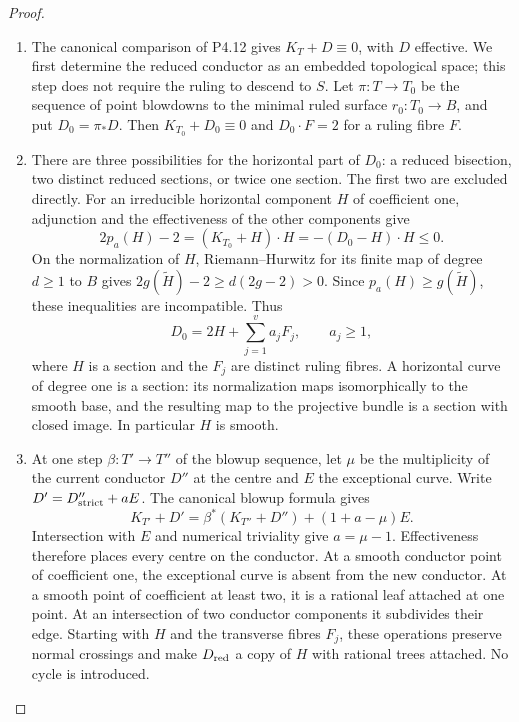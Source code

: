 \begin{proof}

\begin{enumerate}[label={$\langle1\rangle$\arabic*.},leftmargin=*]
\item The canonical comparison of P4.12 gives
$K_T+D\equiv0$, with $D$ effective. We first determine the
reduced conductor as an embedded topological space; this
step does not require the ruling to descend to $S$.
Let $\pi:T\to T_0$ be the sequence of point blowdowns to
the minimal ruled surface $r_0:T_0\to B$, and put
$D_0=\pi_*D$. Then $K_{T_0}+D_0\equiv0$ and
$D_0\cdot F=2$ for a ruling fibre $F$.

\item There are three possibilities for the horizontal part of
$D_0$: a reduced bisection, two distinct reduced sections,
or twice one section. The first two are excluded directly.
For an irreducible horizontal component $H$ of coefficient
one, adjunction and the effectiveness of the other
components give
\[
 2p_a(H)-2=(K_{T_0}+H)\cdot H
       =-(D_0-H)\cdot H\le0.
\]
On the normalization of $H$, Riemann--Hurwitz for its
finite map of degree $d\ge1$ to $B$ gives
$2g(\widetilde H)-2\ge d(2g-2)>0$.
Since $p_a(H)\ge g(\widetilde H)$, these inequalities
are incompatible. Thus
\[
 D_0=2H+\sum_{j=1}^{v}a_jF_j,\qquad a_j\ge1,
\]
where $H$ is a section and the $F_j$ are distinct ruling
fibres. A horizontal curve of degree one is a section:
its normalization maps isomorphically to the smooth base,
and the resulting map to the projective bundle is a
section with closed image. In particular $H$ is smooth.

\item At one step $\beta:T'\to T''$ of the blowup sequence,
let $\mu$ be the multiplicity of the current conductor
$D''$ at the centre and $E$ the exceptional curve.
Write $D'=D''_{\rm strict}+aE$. The canonical blowup
formula gives
\[
 K_{T'}+D'
   =\beta^*(K_{T''}+D'')+(1+a-\mu)E.
\]
Intersection with $E$ and numerical triviality give
$a=\mu-1$. Effectiveness therefore places every centre
on the conductor. At a smooth conductor point of
coefficient one, the exceptional curve is absent from
the new conductor. At a smooth point of coefficient at
least two, it is a rational leaf attached at one point.
At an intersection of two conductor components it
subdivides their edge. Starting with $H$ and the
transverse fibres $F_j$, these operations preserve
normal crossings and make $D_{\rm red}$ a copy of $H$
with rational trees attached. No cycle is introduced.


\end{enumerate}
\end{proof}
